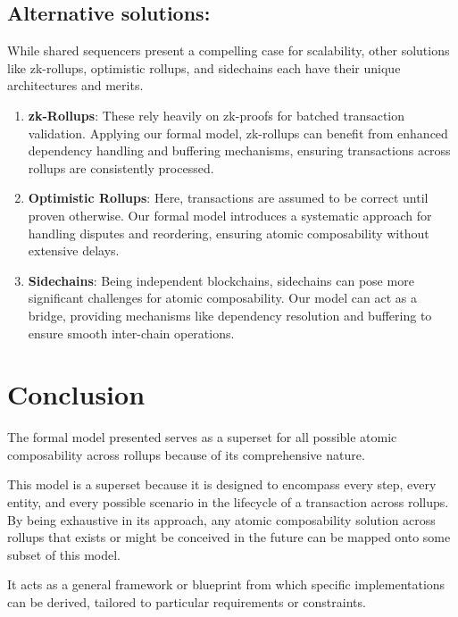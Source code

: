 \documentclass{article}
\begin{document}
\subsection{Alternative solutions:}\label{comparison-with-existing-solutions}

While shared sequencers present a compelling case for scalability, other
solutions like zk-rollups, optimistic rollups, and sidechains each have
their unique architectures and merits.

\begin{enumerate}
\def\labelenumi{\arabic{enumi}.}
\item
  \textbf{zk-Rollups}: These rely heavily on zk-proofs for batched
  transaction validation. Applying our formal model, zk-rollups can
  benefit from enhanced dependency handling and buffering mechanisms,
  ensuring transactions across rollups are consistently processed.
\item
  \textbf{Optimistic Rollups}: Here, transactions are assumed to be
  correct until proven otherwise. Our formal model introduces a
  systematic approach for handling disputes and reordering, ensuring
  atomic composability without extensive delays.
\item
  \textbf{Sidechains}: Being independent blockchains, sidechains can
  pose more significant challenges for atomic composability. Our model
  can act as a bridge, providing mechanisms like dependency resolution
  and buffering to ensure smooth inter-chain operations.
\end{enumerate}

\section{Conclusion}\label{conclusion}

The formal model presented serves as a superset for all possible atomic
composability across rollups because of its comprehensive nature.

This model is a superset because it is designed to encompass every step,
every entity, and every possible scenario in the lifecycle of a
transaction across rollups. By being exhaustive in its approach, any
atomic composability solution across rollups that exists or might be
conceived in the future can be mapped onto some subset of this model. 

It acts as a general framework or blueprint from which specific
implementations can be derived, tailored to particular requirements or
constraints.
\end{document}
